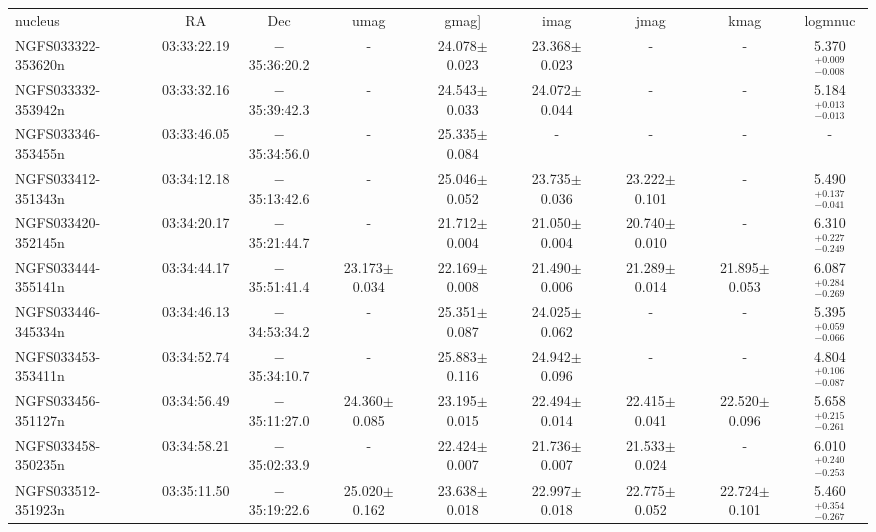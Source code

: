 \begin{tabular}{lcccccccc}
nucleus & RA & Dec & umag & gmag] & imag & jmag  & kmag & logmnuc\\
  NGFS033322-353620n & 03:33:22.19 &$-$35:36:20.2   &	     -           & 24.078$\pm$0.023  & 23.368$\pm$0.023  &          -	     &          -	   &  5.370$_{-0.008} ^{+0.009}$ \\
  NGFS033332-353942n & 03:33:32.16 &$-$35:39:42.3   &	     -           & 24.543$\pm$0.033  & 24.072$\pm$0.044  &          -	     &          -	   &  5.184$_{-0.013} ^{+0.013}$ \\
  NGFS033346-353455n & 03:33:46.05 &$-$35:34:56.0   &	     -           & 25.335$\pm$0.084  &        -          &          -	     &          -	   &             -               \\
  NGFS033412-351343n & 03:34:12.18 &$-$35:13:42.6   &	     -           & 25.046$\pm$0.052  & 23.735$\pm$0.036  &  23.222$\pm$0.101 &          -	   &  5.490$_{-0.041} ^{+0.137}$ \\
  NGFS033420-352145n & 03:34:20.17 &$-$35:21:44.7   &	     -           & 21.712$\pm$0.004  & 21.050$\pm$0.004  &  20.740$\pm$0.010 &          -	   &  6.310$_{-0.249} ^{+0.227}$ \\
  NGFS033444-355141n & 03:34:44.17 &$-$35:51:41.4   &	23.173$\pm$0.034 & 22.169$\pm$0.008  & 21.490$\pm$0.006  &  21.289$\pm$0.014 &  21.895$\pm$0.053   &  6.087$_{-0.269} ^{+0.284}$ \\
  NGFS033446-345334n & 03:34:46.13 &$-$34:53:34.2   &	     -           & 25.351$\pm$0.087  & 24.025$\pm$0.062  &          -	     &          -	   &  5.395$_{-0.066} ^{+0.059}$ \\
  NGFS033453-353411n & 03:34:52.74 &$-$35:34:10.7   &	     -           & 25.883$\pm$0.116  & 24.942$\pm$0.096  &          -	     &          -	   &  4.804$_{-0.087} ^{+0.106}$ \\
  NGFS033456-351127n & 03:34:56.49 &$-$35:11:27.0   &	24.360$\pm$0.085 & 23.195$\pm$0.015  & 22.494$\pm$0.014  &  22.415$\pm$0.041 &  22.520$\pm$0.096   &  5.658$_{-0.261} ^{+0.215}$ \\
  NGFS033458-350235n & 03:34:58.21 &$-$35:02:33.9   &	     -           & 22.424$\pm$0.007  & 21.736$\pm$0.007  &  21.533$\pm$0.024 &          -	   &  6.010$_{-0.253} ^{+0.240}$ \\
  NGFS033512-351923n & 03:35:11.50 &$-$35:19:22.6   &	25.020$\pm$0.162 & 23.638$\pm$0.018  & 22.997$\pm$0.018  &  22.775$\pm$0.052 &  22.724$\pm$0.101   &  5.460$_{-0.267} ^{+0.354}$ \\

\end{tabular}
